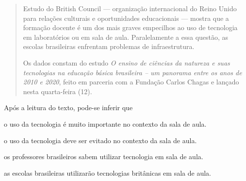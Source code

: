 \begin{escolha}
\begin{escolha}
\begin{escolha}
\begin{quote}
Estudo do British Council --- organização internacional do Reino Unido
para relações culturais e oportunidades educacionais --- mostra que a
formação docente é um dos mais graves empecilhos ao uso de tecnologia em
laboratórios ou em sala de aula. Paralelamente a essa questão, as
escolas brasileiras enfrentam problemas de infraestrutura.

Os dados constam do estudo \textit{O ensino de ciências da natureza e suas
tecnologias na educação básica brasileira -- um panorama entre os anos
de 2010 e 2020}, feito em parceria com a Fundação Carlos Chagas e lançado
nesta quarta-feira (12).
\end{quote}


Após a leitura do texto, pode-se inferir que

\begin{escolha}
  \item o uso da tecnologia é muito importante no contexto da sala de aula.

  \item o uso da tecnologia deve ser evitado no contexto da sala de aula.

  \item os professores brasileiros sabem utilizar tecnologia em sala de aula.

  \item as escolas brasileiras utilizarão tecnologias britânicas em sala de
aula.
\end{escolha}

\end{escolha}
\end{escolha}
\end{escolha}
